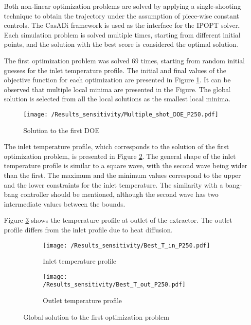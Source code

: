 \documentclass[../Article_Design_of_Experiment.tex]{subfiles}
\begin{document}
	
	\label{CH: Results}

	Both non-linear optimization problems are solved by applying a single-shooting technique to obtain the trajectory under the assumption of piece-wise constant controls. The CasADi framework is used as the interface for the IPOPT solver. Each simulation problem is solved multiple times, starting from different initial points, and the solution with the best score is considered the optimal solution.
	
	The first optimization problem was solved 69 times, starting from random initial guesses for the inlet temperature profile. The initial and final values of the objective function for each optimization are presented in Figure \ref{fig:DOE_T_OBJ}. It can be observed that multiple local minima are presented in the Figure. The global solution is selected from all the local solutions as the smallest local minima. 
	
	\begin{figure}[h!]
		\centering
		\texttt{[image: /Results\_sensitivity/Multiple\_shot\_DOE\_P250.pdf]}
		\caption{Solution to the first DOE}
		\label{fig:DOE_T_OBJ}
	\end{figure}
	
	The inlet temperature profile, which corresponds to the solution of the first optimization problem, is presented in Figure \ref{fig:DOE_T_IN}. The general shape of the inlet temperature profile is similar to a square wave, with the second wave being wider than the first. The maximum and the minimum values correspond to the upper and the lower constraints for the inlet temperature. The similarity with a bang-bang controller should be mentioned, although the second wave has two intermediate values between the bounds.	
	
	Figure \ref{fig:DOE_T_OUT} shows the temperature profile at outlet of the extractor. The outlet profile differs from the inlet profile due to heat diffusion.
		
	\begin{figure}[h!]
		\centering
		\begin{subfigure}[b]{0.49\columnwidth}
			\centering
			\texttt{[image: /Results\_sensitivity/Best\_T\_in\_P250.pdf]}
			\caption{Inlet temperature profile}
			\label{fig:DOE_T_IN}
		\end{subfigure}
		\hfill
		\begin{subfigure}[b]{0.49\columnwidth}
			\centering
			\texttt{[image: /Results\_sensitivity/Best\_T\_out\_P250.pdf]}
			\caption{Outlet temperature profile}
			\label{fig:DOE_T_OUT}
		\end{subfigure}
		\caption{Global solution to the first optimization problem}
		\label{fig:DOE_T}
	\end{figure}
	
	
	
\end{document}
